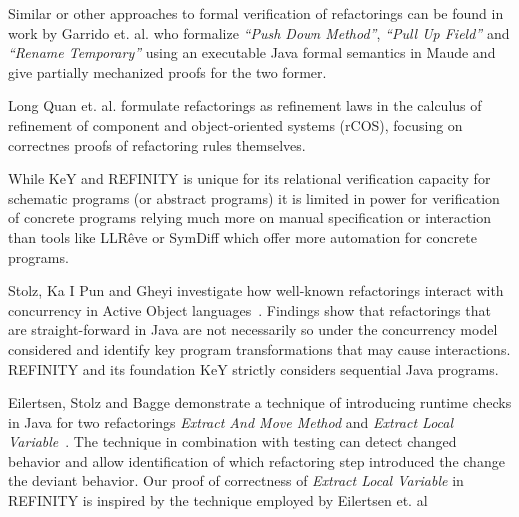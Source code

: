Similar or other approaches to formal verification of refactorings can be found in work by
Garrido et. al. \cite{garrido2006formal} who formalize \emph{``Push Down Method''},
\emph{``Pull Up Field''} and \emph{``Rename Temporary''} using an executable
Java formal semantics in Maude and give partially mechanized proofs for the two former.

Long Quan et. al. \cite{DBLP:conf/isola/QuanQL08} formulate refactorings as refinement
laws in the calculus of refinement of component and object-oriented systems (rCOS),
focusing on correctnes proofs of refactoring rules themselves.

While KeY and REFINITY is unique for its relational verification capacity for
schematic programs (or abstract programs) it is limited in power for verification
of concrete programs relying much more on manual specification or interaction \cite{DBLP:conf/aplas/Steinhofel20}
than tools like LLRêve \cite{DBLP:journals/jar/KieferKU18} or SymDiff \cite{DBLP:conf/cav/LahiriHKR12}
which offer more automation for concrete programs.


Stolz, Ka I Pun and Gheyi investigate how well-known refactorings interact with concurrency in Active Object languages~\cite{DBLP:conf/isola/StolzPG20}.
Findings show that refactorings that are straight-forward in Java are not necessarily so under the concurrency model considered and identify key
program transformations that may cause interactions.
REFINITY and its foundation KeY strictly considers sequential Java programs.

Eilertsen, Stolz and Bagge demonstrate a technique of introducing runtime checks in Java for two refactorings \emph{Extract And Move Method} and
\emph{Extract Local Variable}~\cite{stolz:isolarefa}. The technique in combination with testing can detect changed behavior and allow identification
of which refactoring step introduced the change the deviant behavior.
Our proof of correctness of \emph{Extract Local Variable} in REFINITY is inspired by the technique employed by Eilertsen et. al




